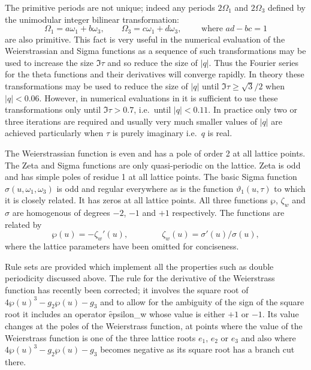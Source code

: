 The primitive periods are not unique;
indeed any periods $2\Omega_1$ and $2\Omega_3$ defined by the unimodular integer bilinear transformation:
\[\Omega_1 = a\omega_1 + b\omega_3,\qquad\Omega_3 = c\omega_1 + d\omega_3,\qquad\text{ where }ad-bc = 1\]
are also primitive. This fact is very useful in the numerical evaluation of the Weierstrassian and Sigma
functions as a sequence of such transformations may be used to increase the size $\Im \tau$ and so reduce
the size of $|q|$. Thus the Fourier series for the theta functions and their derivatives will converge rapidly.
In theory these transformations may be used to reduce the size of $|q|$ until $\Im \tau \geq \sqrt 3/2$ when
$|q|<0.06$. However, in numerical evaluations in \REDUCE it is sufficient to use these transformations only until
$\Im \tau > 0.7$, i.e.~until $|q| < 0.11$. In practice only two or three iterations are required
and usually very much smaller values of $|q|$ are achieved particularly when $\tau$ is purely imaginary i.e.~$q$ is real.

The Weierstrassian function is even and has a pole of order 2 at all lattice points.
The Zeta and Sigma functions are only quasi-periodic on the lattice. Zeta is odd and has simple poles of residue
1 at all lattice points. The basic Sigma function $\sigma(u,\omega_1,\omega_3)$ is odd
and regular everywhere as is the function $\vartheta_1(u,\tau)$ to which it is closely related.
It has zeros at all lattice points. All three functions $\wp$, $\zeta_w$ and $\sigma$ are
homogenous of degrees $-2$, $-1$ and $+1$ respectively. The functions are related by
\[ \wp(u) = -\zeta_w'(u),\qquad\qquad \zeta_w(u) = \sigma'(u)/\sigma(u),\]
where the lattice parameters have been omitted for conciseness.

Rule sets are provided which implement all the properties such as double periodicity
discussed above. The rule for the derivative of the Weierstrass function has recently
been corrected; it involves the square root of  $4\wp(u)^3-g_2\wp(u)-g_3$ and to allow
for the ambiguity of the sign of the square root it includes an operator \f{epsilon\_w}
whose value is either $+1$ or $-1$. Its value changes at the poles of the Weierstrass
function, at points where the value of the Weierstrass function is one of the three lattice
roots $e_1$, $e_2$ or $e_3$ and also where $4\wp(u)^3-g_2\wp(u)-g_3$ becomes negative
as its square root has a branch cut there.

